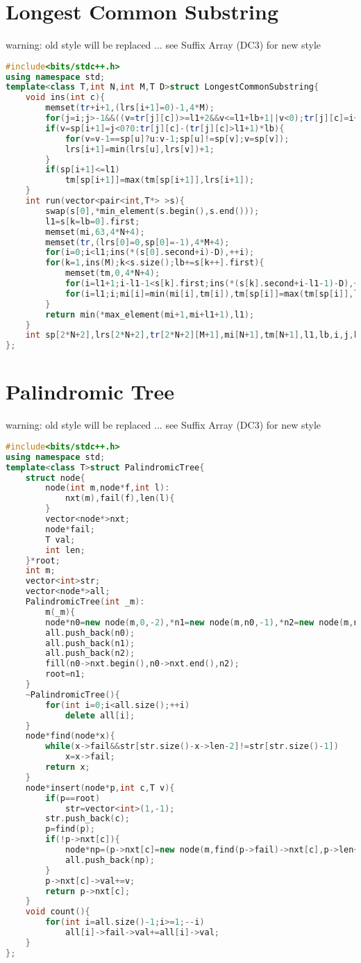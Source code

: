 \documentclass{book}
\begin{document}
\section{Longest Common Substring}
warning: old style will be replaced ... see Suffix Array (DC3) for new style\begin{lstlisting}[language=C++,title={Longest Common Substring.hpp (1181 bytes, 28 lines)}]
#include<bits/stdc++.h>
using namespace std;
template<class T,int N,int M,T D>struct LongestCommonSubstring{
    void ins(int c){
        memset(tr+i+1,(lrs[i+1]=0)-1,4*M);
        for(j=i;j>-1&&((v=tr[j][c])>=l1+2&&v<=l1+lb+1||v<0);tr[j][c]=i+1+lb,j=sp[u=j]);
        if(v=sp[i+1]=j<0?0:tr[j][c]-(tr[j][c]>l1+1)*lb){
            for(v=v-1==sp[u]?u:v-1;sp[u]!=sp[v];v=sp[v]);
            lrs[i+1]=min(lrs[u],lrs[v])+1;
        }
        if(sp[i+1]<=l1)
            tm[sp[i+1]]=max(tm[sp[i+1]],lrs[i+1]);
    }
    int run(vector<pair<int,T*> >s){
        swap(s[0],*min_element(s.begin(),s.end()));
        l1=s[k=lb=0].first;
        memset(mi,63,4*N+4);
        memset(tr,(lrs[0]=0,sp[0]=-1),4*M+4);
        for(i=0;i<l1;ins(*(s[0].second+i)-D),++i);
        for(k=1,ins(M);k<s.size();lb+=s[k++].first){
            memset(tm,0,4*N+4);
            for(i=l1+1;i-l1-1<s[k].first;ins(*(s[k].second+i-l1-1)-D),++i);
            for(i=l1;i;mi[i]=min(mi[i],tm[i]),tm[sp[i]]=max(tm[sp[i]],lrs[i]*!!tm[i]),--i);
        }
        return min(*max_element(mi+1,mi+l1+1),l1);
    }
    int sp[2*N+2],lrs[2*N+2],tr[2*N+2][M+1],mi[N+1],tm[N+1],l1,lb,i,j,k,u,v;
};
\end{lstlisting}
\section{Palindromic Tree}
warning: old style will be replaced ... see Suffix Array (DC3) for new style\begin{lstlisting}[language=C++,title={Palindromic Tree.hpp (1327 bytes, 50 lines)}]
#include<bits/stdc++.h>
using namespace std;
template<class T>struct PalindromicTree{
    struct node{
        node(int m,node*f,int l):
            nxt(m),fail(f),len(l){
        }
        vector<node*>nxt;
        node*fail;
        T val;
        int len;
    }*root;
    int m;
    vector<int>str;
    vector<node*>all;
    PalindromicTree(int _m):
        m(_m){
        node*n0=new node(m,0,-2),*n1=new node(m,n0,-1),*n2=new node(m,n1,0);
        all.push_back(n0);
        all.push_back(n1);
        all.push_back(n2);
        fill(n0->nxt.begin(),n0->nxt.end(),n2);
        root=n1;
    }
    ~PalindromicTree(){
        for(int i=0;i<all.size();++i)
            delete all[i];
    }
    node*find(node*x){
        while(x->fail&&str[str.size()-x->len-2]!=str[str.size()-1])
            x=x->fail;
        return x;
    }
    node*insert(node*p,int c,T v){
        if(p==root)
            str=vector<int>(1,-1);
        str.push_back(c);
        p=find(p);
        if(!p->nxt[c]){
            node*np=(p->nxt[c]=new node(m,find(p->fail)->nxt[c],p->len+2));
            all.push_back(np);
        }
        p->nxt[c]->val+=v;
        return p->nxt[c];
    }
    void count(){
        for(int i=all.size()-1;i>=1;--i)
            all[i]->fail->val+=all[i]->val;
    }
};
\end{lstlisting}
\end{document}
